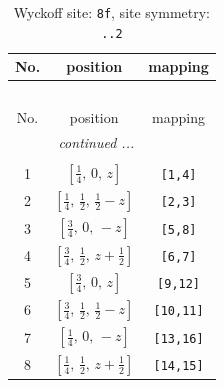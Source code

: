 \documentclass[fleqn,8pt]{jsarticle}
\begin{document}
\begin{longtable}{ccc}
\caption{Wyckoff site: {\tt 8f}, site symmetry: {\tt ..2}}
 \\
 \hline \hline
No. & position & mapping \\ \hline \endfirsthead

\multicolumn{2}{l}{\tablename\ \thetable{}} \\
 \hline \hline
No. & position & mapping \\ \hline \endhead

 \hline \hline
\multicolumn{2}{r}{\footnotesize\it continued ...} \\ \endfoot

 \hline \hline
\multicolumn{2}{r}{} \\ \endlastfoot

1 & $\left[ \frac{1}{4},\, 0,\, z \right]$ & {\tt [1,4]} \\ \hline
2 & $\left[ \frac{1}{4},\, \frac{1}{2},\, \frac{1}{2} - z \right]$ & {\tt [2,3]} \\ \hline
3 & $\left[ \frac{3}{4},\, 0,\, - z \right]$ & {\tt [5,8]} \\ \hline
4 & $\left[ \frac{3}{4},\, \frac{1}{2},\, z + \frac{1}{2} \right]$ & {\tt [6,7]} \\ \hline
5 & $\left[ \frac{3}{4},\, 0,\, z \right]$ & {\tt [9,12]} \\ \hline
6 & $\left[ \frac{3}{4},\, \frac{1}{2},\, \frac{1}{2} - z \right]$ & {\tt [10,11]} \\ \hline
7 & $\left[ \frac{1}{4},\, 0,\, - z \right]$ & {\tt [13,16]} \\ \hline
8 & $\left[ \frac{1}{4},\, \frac{1}{2},\, z + \frac{1}{2} \right]$ & {\tt [14,15]} \\
\end{longtable}
\renewcommand{\arraystretch}{1.2}
\end{document}
